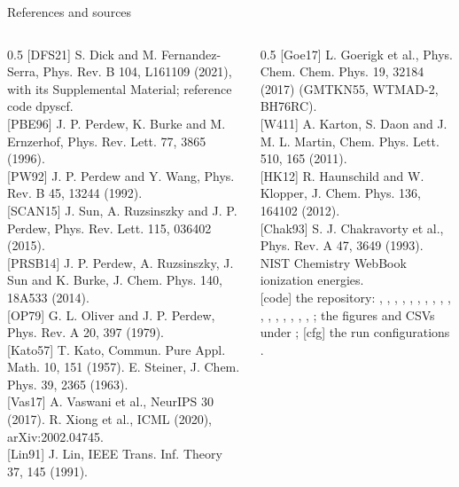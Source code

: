 \begin{frame}{References and sources}
  \scriptsize
  \begin{columns}[T]
  \begin{column}{0.5\linewidth}
  [DFS21] S. Dick and M. Fernandez-Serra, Phys. Rev. B 104, L161109 (2021), with its Supplemental Material; reference code dpyscf.\\[0.3em]
  [PBE96] J. P. Perdew, K. Burke and M. Ernzerhof, Phys. Rev. Lett. 77, 3865 (1996).\\[0.3em]
  [PW92] J. P. Perdew and Y. Wang, Phys. Rev. B 45, 13244 (1992).\\[0.3em]
  [SCAN15] J. Sun, A. Ruzsinszky and J. P. Perdew, Phys. Rev. Lett. 115, 036402 (2015).\\[0.3em]
  [PRSB14] J. P. Perdew, A. Ruzsinszky, J. Sun and K. Burke, J. Chem. Phys. 140, 18A533 (2014).\\[0.3em]
  [OP79] G. L. Oliver and J. P. Perdew, Phys. Rev. A 20, 397 (1979).\\[0.3em]
  [Kato57] T. Kato, Commun. Pure Appl. Math. 10, 151 (1957). \quad [Steiner63] E. Steiner, J. Chem. Phys. 39, 2365 (1963).\\[0.3em]
  [Vas17] A. Vaswani et al., NeurIPS 30 (2017). \quad [Xio20] R. Xiong et al., ICML (2020), arXiv:2002.04745.\\[0.3em]
  [Lin91] J. Lin, IEEE Trans. Inf. Theory 37, 145 (1991).
  \end{column}
  \begin{column}{0.5\linewidth}
  [Goe17] L. Goerigk et al., Phys. Chem. Chem. Phys. 19, 32184 (2017) (GMTKN55, WTMAD-2, BH76RC).\\[0.3em]
  [W411] A. Karton, S. Daon and J. M. L. Martin, Chem. Phys. Lett. 510, 165 (2011).\\[0.3em]
  [HK12] R. Haunschild and W. Klopper, J. Chem. Phys. 136, 164102 (2012).\\[0.3em]
  [Chak93] S. J. Chakravorty et al., Phys. Rev. A 47, 3649 (1993). \quad [NIST] NIST Chemistry WebBook ionization energies.\\[0.3em]
  [code] the repository: , , , , , , , , , , , , , , , , , ; the figures and CSVs under ; [cfg] the run configurations .
  \end{column}
  \end{columns}
\end{frame}

